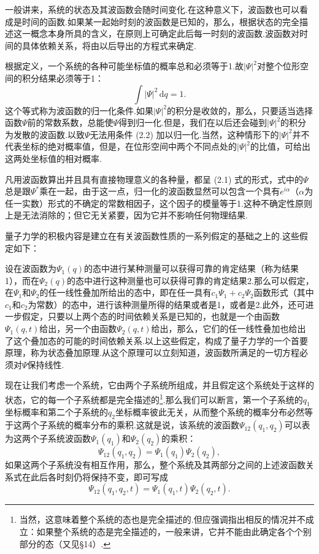一般讲来，系统的状态及其波函数会随时间变化.在这种意义下，波函数也可以看成是时间的函数.如果某一起始时刻的波函数是已知的，那么，根据状态的完全描述这一概念本身所具的含义，在原则上可确定此后每一时刻的波函数.波函数对时间的具体依赖关系，将由以后导出的方程式来确定.

根据定义，一个系统的各种可能坐标值的概率总和必须等于1.故$|\varPsi|^2$对整个位形空间的积分结果必须等于1：
\begin{equation}
  \int|\varPsi|^2\,\mathrm{d}q=1.
\end{equation}
这个等式称为波函数的归一化条件.如果$|\varPsi|^2$的积分是收敛的，那么，只要适当选择函数$\varPsi$前的常数系数，总能使$\varPsi$得到归一化.但是，我们在以后还会碰到$|\varPsi|^2$的积分为发散的波函数.以致$\varPsi$无法用条件 (2.2) 加以归一化.当然，这种情形下的$|\varPsi|^2$并不代表坐标的绝对概率值，但是，在位形空间中两个不同点处的$|\varPsi|^2$的比值，可给出这两处坐标值的相对概率.

凡用波函数算出并且具有直接物理意义的各种量，都呈 (2.1) 式的形式，式中的$\varPsi$总是跟$\varPsi^{*}$乘在一起，由于这一点，归一化的波函数显然可以包含一个具有$e^{i\alpha}$（$\alpha$为任一实数）形式的不确定的常数相因子，这个因子的模量等于1.这种不确定性原则上是无法消除的；但它无关紧要，因为它并不影响任何物理结果.

量子力学的积极内容是建立在有关波函数性质的一系列假定的基础之上的.这些假定如下：

设在波函数为$\varPsi_1(q)$的态中进行某种测量可以获得可靠的肯定结果（称为结果1），而在$\varPsi_2(q)$的态中进行这种测量也可以获得可靠的肯定结果2.那么可以假定，在$\varPsi_1$和$\varPsi_2$的任一线性叠加所给出的态中，即在任一具有$c_1\varPsi_1+c_2\varPsi_2$函数形式（其中$c_1$和$c_2$为常数）的态中，进行该种测量所得的结果或者是1，或者是2.此外，还可进一步假定，只要以上两个态的时间依赖关系是已知的，也就是一个由函数$\varPsi_1(q,t)$给出，另一个由函数$\varPsi_2(q,t)$给出，那么，它们的任一线性叠加也给出了这个叠加态的可能的时间依赖关系.以上这些假定，构成了量子力学的一个首要原理，称为状态叠加原理.从这个原理可以立刻知道，波函数所满足的一切方程必须对$\varPsi$保持线性.

现在让我们考虑一个系统，它由两个子系统所组成，并且假定这个系统处于这样的状态，它的每一个子系统都是完全描述的\footnote{当然，这意味着整个系统的态也是完全描述的.但应强调指出相反的情况并不成立：如果整个系统的态是完全描述的，一般来讲，它并不能由此确定各个个别部分的态（又见§14）.}.那么我们可以断言，第一个子系统的$q_1$坐标概率和第二个子系统的$q_2$坐标概率彼此无关，从而整个系统的概率分布必然等于这两个子系统的概率分布的乘积.这就是说，该系统的波函数$\varPsi_{12}(q_1,q_2)$可以表为这两个子系统波函数$\varPsi_1(q_1)$和$\varPsi_2(q_2)$的乘积：
\begin{equation}
  \varPsi_{12}(q_1,q_2)=\varPsi_1(q_1)\varPsi_2(q_2),
\end{equation}
如果这两个子系统没有相互作用，那么，整个系统及其两部分之间的上述波函数关系式在此后各时刻仍将保持不变，即可写成
\begin{equation}
  \varPsi_{12}(q_1,q_2,t)=\varPsi_1(q_1,t)\varPsi_2(q_2,t).
\end{equation}

